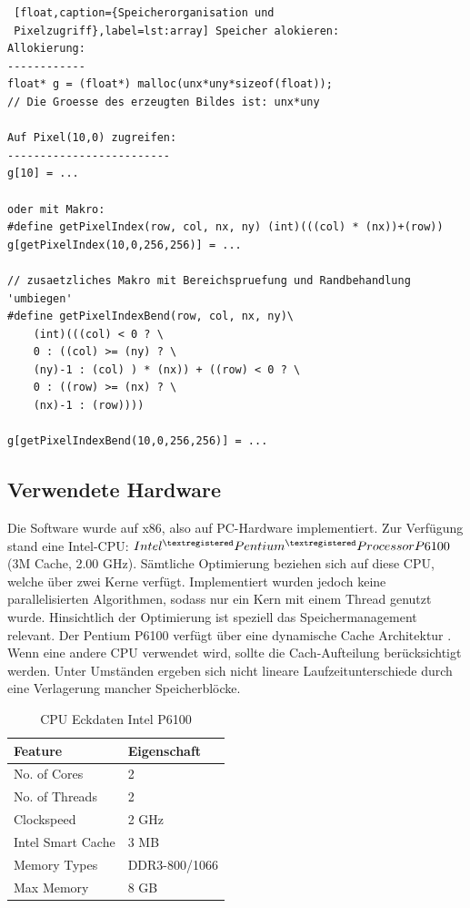\documentclass[a4paper,12pt]{article}
\begin{document}
 \begin{lstlisting} [float,caption={Speicherorganisation und
 Pixelzugriff},label=lst:array] Speicher alokieren:
Allokierung:
------------
float* g = (float*) malloc(unx*uny*sizeof(float));
// Die Groesse des erzeugten Bildes ist: unx*uny

Auf Pixel(10,0) zugreifen:
-------------------------
g[10] = ...
 
oder mit Makro:
#define getPixelIndex(row, col, nx, ny) (int)(((col) * (nx))+(row))
g[getPixelIndex(10,0,256,256)] = ...

// zusaetzliches Makro mit Bereichspruefung und Randbehandlung 'umbiegen'
#define getPixelIndexBend(row, col, nx, ny)\
	(int)(((col) < 0 ? \
	0 : ((col) >= (ny) ? \
	(ny)-1 : (col) ) * (nx)) + ((row) < 0 ? \
	0 : ((row) >= (nx) ? \
	(nx)-1 : (row))))

g[getPixelIndexBend(10,0,256,256)] = ...
\end{lstlisting}


\subsection{Verwendete Hardware}
Die Software wurde auf x86, also auf PC-Hardware implementiert. Zur Verfügung
stand eine Intel-CPU: $Intel^{\textregistered} Pentium^{\textregistered}
Processor P6100$ (3M Cache, 2.00 GHz). Sämtliche Optimierung beziehen
sich auf diese CPU, welche über zwei Kerne verfügt. Implementiert wurden jedoch
keine parallelisierten Algorithmen, sodass nur ein Kern mit einem Thread genutzt
wurde.
 Hinsichtlich der Optimierung ist speziell das Speichermanagement relevant. Der
 Pentium P6100 verfügt über eine dynamische Cache Architektur \cite{intel}. Wenn eine andere CPU verwendet wird, sollte die Cach-Aufteilung
berücksichtigt werden. Unter Umständen ergeben sich nicht lineare
Laufzeitunterschiede durch eine Verlagerung mancher Speicherblöcke.



\begin{table}[htbp]
\begin{center}
\begin{tabular}{ | l | l |}
\hline
Feature			& Eigenschaft \\ \hline
No. of Cores			&	2 \\
No. of Threads		&	2 \\
Clockspeed	&	2 GHz \\
Intel Smart Cache		&	3 MB \\
Memory Types		&	DDR3-800/1066 \\
Max Memory			&	8 GB \\ \hline
\end{tabular}
\caption{CPU Eckdaten Intel P6100\cite{intel}}
\label{tab:cpu}
\end{center}
\end{table}
\end{document}
